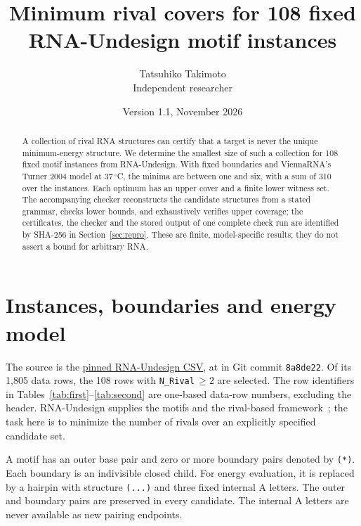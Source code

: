 \documentclass[10pt,a4paper]{article}
\title{Minimum rival covers for 108 fixed\\RNA-Undesign motif instances}
\author{Tatsuhiko Takimoto\\\small Independent researcher}
\date{Version 1.1, November 2026}
\begin{document}
\maketitle
\begin{abstract}
A collection of rival RNA structures can certify that a target is never the unique minimum-energy structure. We determine the smallest size of such a collection for 108 fixed motif instances from RNA-Undesign. With fixed boundaries and ViennaRNA's Turner 2004 model at 37\,$^\circ$C, the minima are between one and six, with a sum of 310 over the instances. Each optimum has an upper cover and a finite lower witness set. The accompanying checker reconstructs the candidate structures from a stated grammar, checks lower bounds, and exhaustively verifies upper coverage; the certificates, the checker and the stored output of one complete check run are identified by SHA-256 in Section~\ref{sec:repro}. These are finite, model-specific results; they do not assert a bound for arbitrary RNA.
\end{abstract}
\section{Instances, boundaries and energy model}
The source is the \href{https://raw.githubusercontent.com/shanry/RNA-Undesign/8a8de22/data/motifs_maxlen14_no_external/results.uniq.csv}{pinned RNA-Undesign CSV}, at  in Git commit \texttt{8a8de22}. Of its 1,805 data rows, the 108 rows with \texttt{N\_Rival}\,$\ge2$ are selected. The row identifiers in Tables~\ref{tab:first}--\ref{tab:second} are one-based data-row numbers, excluding the header. RNA-Undesign supplies the motifs and the rival-based framework~\cite{rigende,fastmotif}; the task here is to minimize the number of rivals over an explicitly specified candidate set.

A motif has an outer base pair and zero or more boundary pairs denoted by \texttt{(*)}. Each boundary is an indivisible closed child. For energy evaluation, it is replaced by a hairpin with structure \texttt{(...)} and three fixed internal A letters. The outer and boundary pairs are preserved in every candidate. The internal A letters are never available as new pairing endpoints.
\end{document}
